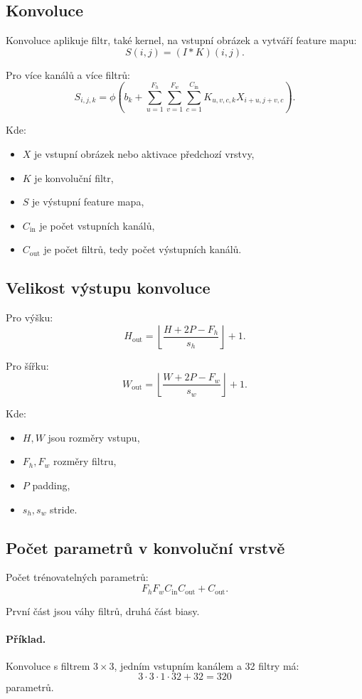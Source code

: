 \subsection{Konvoluce}

Konvoluce aplikuje filtr, také kernel, na vstupní obrázek a vytváří feature mapu:
\[
S(i,j)=(I*K)(i,j).
\]

Pro více kanálů a více filtrů:
\[
S_{i,j,k}
=
\phi
\left(
b_k+
\sum_{u=1}^{F_h}
\sum_{v=1}^{F_w}
\sum_{c=1}^{C_{\text{in}}}
K_{u,v,c,k}X_{i+u,j+v,c}
\right).
\]

Kde:
\begin{itemize}
    \item $X$ je vstupní obrázek nebo aktivace předchozí vrstvy,
    \item $K$ je konvoluční filtr,
    \item $S$ je výstupní feature mapa,
    \item $C_{\text{in}}$ je počet vstupních kanálů,
    \item $C_{\text{out}}$ je počet filtrů, tedy počet výstupních kanálů.
\end{itemize}

\subsection{Velikost výstupu konvoluce}

Pro výšku:
\[
H_{\text{out}}
=
\left\lfloor
\frac{H+2P-F_h}{s_h}
\right\rfloor
+1.
\]

Pro šířku:
\[
W_{\text{out}}
=
\left\lfloor
\frac{W+2P-F_w}{s_w}
\right\rfloor
+1.
\]

Kde:
\begin{itemize}
    \item $H,W$ jsou rozměry vstupu,
    \item $F_h,F_w$ rozměry filtru,
    \item $P$ padding,
    \item $s_h,s_w$ stride.
\end{itemize}

\subsection{Počet parametrů v konvoluční vrstvě}

Počet trénovatelných parametrů:
\[
F_hF_wC_{\text{in}}C_{\text{out}}+C_{\text{out}}.
\]

První část jsou váhy filtrů, druhá část biasy.

\paragraph{Příklad.}
Konvoluce s filtrem $3\times 3$, jedním vstupním kanálem a 32 filtry má:
\[
3\cdot 3\cdot 1\cdot 32 + 32 = 320
\]
parametrů.

